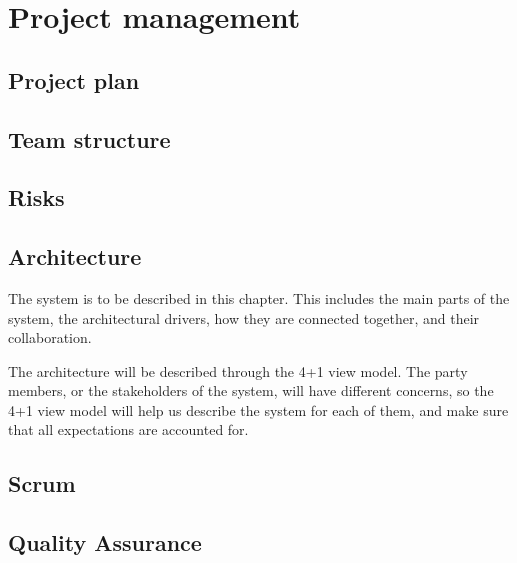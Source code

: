 \chapter{Project management}

\section{Project plan}







\section{Team structure}



\section{Risks}

\section{Architecture}
The system is to be described in this chapter. This includes the main parts of the system, the architectural drivers, how they are connected together, and their collaboration. 

The architecture will be described through the 4+1 view model. The party members, or the stakeholders of the system, will have different concerns, so the 4+1 view model will help us describe the system for each of them, and make sure that all expectations are accounted for.  

\section{Scrum}

\section{Quality Assurance}
